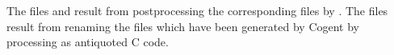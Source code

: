 The files  and  result from postprocessing the corresponding 
 files by . The files  result from renaming the files
 which have been generated by Cogent by processing  as antiquoted C code.
